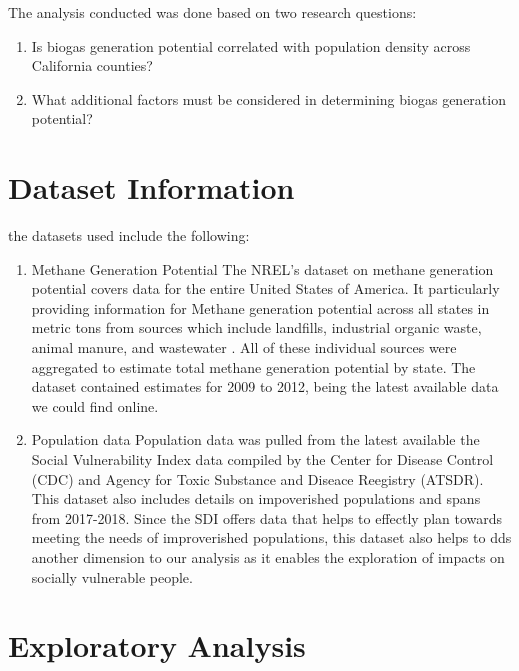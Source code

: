 \documentclass[
  12pt,
]{article}
\begin{document}
The analysis conducted was done based on two research questions:

\begin{enumerate}
\def\labelenumi{\arabic{enumi}.}
\item
  Is biogas generation potential correlated with population density
  across California counties?
\item
  What additional factors must be considered in determining biogas
  generation potential?
\end{enumerate}

\newpage

\hypertarget{dataset-information}{%
\section{Dataset Information}\label{dataset-information}}

the datasets used include the following:

\begin{enumerate}
\def\labelenumi{\arabic{enumi}.}
\item
  Methane Generation Potential The NREL's dataset on methane generation
  potential covers data for the entire United States of America. It
  particularly providing information for Methane generation potential
  across all states in metric tons from sources which include landfills,
  industrial organic waste, animal manure, and wastewater . All of these
  individual sources were aggregated to estimate total methane
  generation potential by state. The dataset contained estimates for
  2009 to 2012, being the latest available data we could find online.
\item
  Population data Population data was pulled from the latest available
  the Social Vulnerability Index data compiled by the Center for Disease
  Control (CDC) and Agency for Toxic Substance and Diseace Reegistry
  (ATSDR). This dataset also includes details on impoverished
  populations and spans from 2017-2018. Since the SDI offers data that
  helps to effectly plan towards meeting the needs of improverished
  populations, this dataset also helps to dds another dimension to our
  analysis as it enables the exploration of impacts on socially
  vulnerable people.
\end{enumerate}

\newpage

\hypertarget{exploratory-analysis}{%
\section{Exploratory Analysis}\label{exploratory-analysis}}
\end{document}
